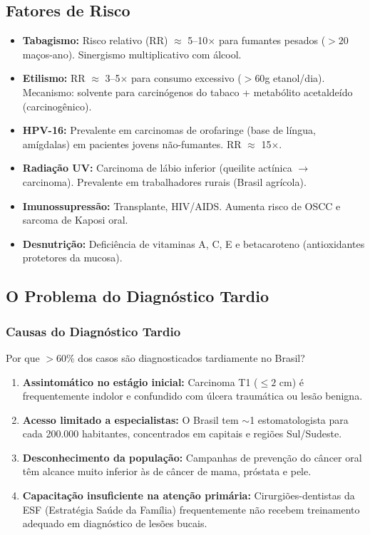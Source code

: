 \subsection{Fatores de Risco}

\begin{itemize}
  \item \textbf{Tabagismo:} Risco relativo (RR) $\approx$ 5--10$\times$ para
        fumantes pesados ($> 20$ maços-ano). Sinergismo multiplicativo com álcool.
  \item \textbf{Etilismo:} RR $\approx$ 3--5$\times$ para consumo excessivo
        ($> 60$g etanol/dia). Mecanismo: solvente para carcinógenos do tabaco +
        metabólito acetaldeído (carcinogênico).
  \item \textbf{HPV-16:} Prevalente em carcinomas de orofaringe (base de língua,
        amígdalas) em pacientes jovens não-fumantes. RR $\approx$ 15$\times$.
  \item \textbf{Radiação UV:} Carcinoma de lábio inferior (queilite actínica $\to$
        carcinoma). Prevalente em trabalhadores rurais (Brasil agrícola).
  \item \textbf{Imunossupressão:} Transplante, HIV/AIDS. Aumenta risco de OSCC e
        sarcoma de Kaposi oral.
  \item \textbf{Desnutrição:} Deficiência de vitaminas A, C, E e betacaroteno
        (antioxidantes protetores da mucosa).
\end{itemize}

\subsection{O Problema do Diagnóstico Tardio}

\subsubsection{Causas do Diagnóstico Tardio}

Por que $> 60\%$ dos casos são diagnosticados tardiamente no Brasil?

\begin{enumerate}
  \item \textbf{Assintomático no estágio inicial:} Carcinoma T1 ($\leq 2$ cm) é
        frequentemente indolor e confundido com úlcera traumática ou lesão benigna.
  \item \textbf{Acesso limitado a especialistas:} O Brasil tem $\sim$1 estomatologista
        para cada 200.000 habitantes, concentrados em capitais e regiões Sul/Sudeste.
  \item \textbf{Desconhecimento da população:} Campanhas de prevenção do câncer oral
        têm alcance muito inferior às de câncer de mama, próstata e pele.
  \item \textbf{Capacitação insuficiente na atenção primária:} Cirurgiões-dentistas
        da ESF (Estratégia Saúde da Família) frequentemente não recebem treinamento
        adequado em diagnóstico de lesões bucais.
\end{enumerate}

